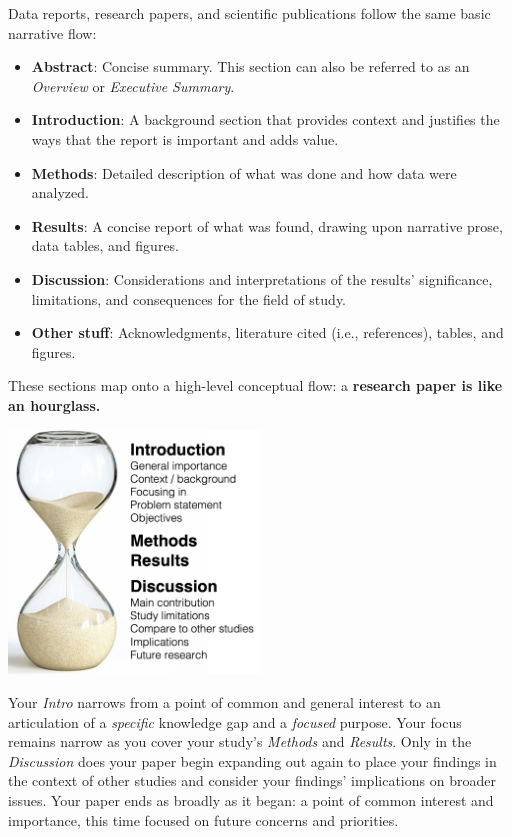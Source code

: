 \documentclass[
]{book}
\providecommand{\tightlist}{%
  \setlength{\itemsep}{0pt}\setlength{\parskip}{0pt}}
\begin{document}
Data reports, research papers, and scientific publications follow the same basic narrative flow:

\begin{itemize}
\tightlist
\item
  \textbf{Abstract}: Concise summary. This section can also be referred to as an \emph{Overview} or \emph{Executive Summary}.
\item
  \textbf{Introduction}: A background section that provides context and justifies the ways that the report is important and adds value.\\
\item
  \textbf{Methods}: Detailed description of what was done and how data were analyzed.\\
\item
  \textbf{Results}: A concise report of what was found, drawing upon narrative prose, data tables, and figures.
\item
  \textbf{Discussion}: Considerations and interpretations of the results' significance, limitations, and consequences for the field of study.
\item
  \textbf{Other stuff}: Acknowledgments, literature cited (i.e., references), tables, and figures.
\end{itemize}

These sections map onto a high-level conceptual flow: a \textbf{research paper is like an hourglass.}

\includegraphics[width=0.5\textwidth,height=\textheight]{img/hourglass.png}

Your \emph{Intro} narrows from a point of common and general interest to an articulation of a \emph{specific} knowledge gap and a \emph{focused} purpose. Your focus remains narrow as you cover your study's \emph{Methods} and \emph{Results}. Only in the \emph{Discussion} does your paper begin expanding out again to place your findings in the context of other studies and consider your findings' implications on broader issues. Your paper ends as broadly as it began: a point of common interest and importance, this time focused on future concerns and priorities.
\end{document}
